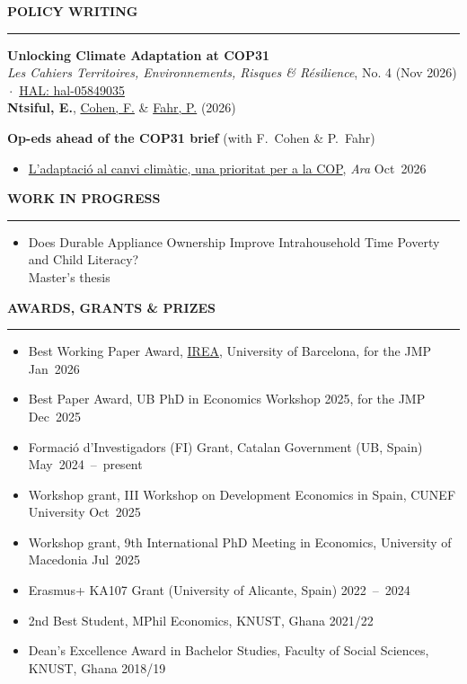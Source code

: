 \documentclass{resume} %
\def\sectionskip{\vspace{4pt}}
\def\sectionlineskip{\smallskip}
\renewenvironment{rSection}[1]{%
  \sectionskip
  \MakeUppercase{{\bf #1}}%
  \sectionlineskip
  \hrule
  \begin{list}{}{\setlength{\leftmargin}{0em}\setlength{\topsep}{5pt}\setlength{\itemsep}{0pt}\setlength{\parsep}{0pt}}%
  \item[]
}{%
  \end{list}
}
\newcommand{\when}[1]{\hfill\mbox{#1}}
\begin{document}
\begin{rSection}{Policy Writing}
\textbf{Unlocking Climate Adaptation at COP31}\\
\textit{Les Cahiers Territoires, Environnements, Risques \& R\'esilience}, No. 4 (Nov 2026) \,$\cdot$\, \href{https://hal.science/hal-05849035}{HAL: hal-05849035}\\
\textbf{Ntsiful, E.}, \href{https://sites.google.com/site/francoiscoheneconomist/home}{Cohen, F.} \& \href{https://www.phc.ox.ac.uk/team/patrick-fahr}{Fahr, P.} (2026)

\smallskip
\textbf{Op-eds ahead of the COP31 brief} (with F.~Cohen \& P.~Fahr)
\begin{itemize}
\item \href{https://empreses.ara.cat/opinio/l-adaptacio-canvi-climatic-prioritat-cop_129_5879985.html}{L'adaptaci\'o al canvi clim\`atic, una prioritat per a la COP}, \textit{Ara} \when{Oct 2026}
\end{itemize}
\end{rSection}


\begin{rSection}{Work in Progress}
\raggedright
\begin{itemize}
\item Does Durable Appliance Ownership Improve Intrahousehold Time Poverty and Child Literacy?\\
{\small Master's thesis}
\end{itemize}
\end{rSection}


\begin{rSection}{Awards, Grants \& Prizes}
\begin{itemize}
\item Best Working Paper Award, \href{https://www.ub.edu/irea/}{IREA}, University of Barcelona, for the JMP \when{Jan 2026}
\item Best Paper Award, UB PhD in Economics Workshop 2025, for the JMP \when{Dec 2025}
\item Formació d'Investigadors (FI) Grant, Catalan Government (UB, Spain) \when{May 2024 -- present}
\item Workshop grant, III Workshop on Development Economics in Spain, CUNEF University \when{Oct 2025}
\item Workshop grant, 9th International PhD Meeting in Economics, University of Macedonia \when{Jul 2025}
\item Erasmus+ KA107 Grant (University of Alicante, Spain) \when{2022 -- 2024}
\item 2nd Best Student, MPhil Economics, KNUST, Ghana \when{2021/22}
\item Dean’s Excellence Award in Bachelor Studies, Faculty of Social Sciences, KNUST, Ghana \when{2018/19}
\end{itemize}
\end{rSection}
\end{document}
